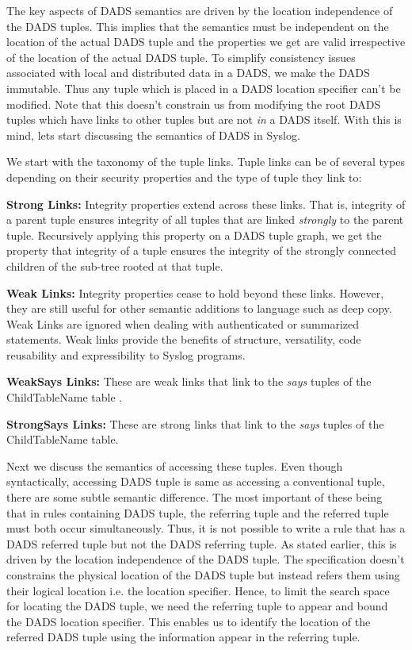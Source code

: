 The key aspects of DADS semantics are driven by the location independence of the DADS tuples. This implies that the semantics must be independent on the location of the actual DADS tuple and the properties we get are valid irrespective of the location of the actual DADS tuple. To simplify consistency issues associated with local and distributed data in a DADS, we make the DADS immutable. Thus any tuple which is placed in a DADS location specifier can't be modified. Note that this doesn't constrain us from modifying the root DADS tuples which have links to other tuples but are not {\em in} a DADS itself. With this is mind, lets start discussing the semantics of DADS in Syslog.

We start with the taxonomy of the tuple links. Tuple links can be of several types depending on their security properties and the type of tuple they link to:
\be
\item {\bf Strong Links:} Integrity properties extend across these links. That is, integrity of a parent tuple ensures integrity of all tuples that are linked {\em strongly} to the parent tuple. Recursively applying this property on a DADS tuple graph, we get the property that integrity of a tuple ensures the integrity of the strongly connected children of the sub-tree rooted at that tuple.
\item {\bf Weak Links:} Integrity properties cease to hold beyond these links. However, they are still useful for other semantic additions to language such as deep copy. Weak Links are ignored when dealing with authenticated or summarized statements. Weak links provide the benefits of structure, versatility, code reusability and expressibility to Syslog programs.
\item {\bf WeakSays Links:} These are weak links that link to the {\em says} tuples of the ChildTableName table . 
\item {\bf StrongSays Links:} These are strong links that link to the {\em says} tuples of the ChildTableName table.
\ee

Next we discuss the semantics of accessing these tuples. Even though syntactically, accessing DADS tuple is same as accessing a conventional tuple, there are some subtle semantic difference. The most important of these being that in rules containing DADS tuple, the referring tuple and the referred tuple must both occur simultaneously. Thus, it is not possible to write a rule that has a DADS referred tuple but not the DADS referring tuple. As stated earlier, this is driven by the location independence of the DADS tuple. The specification doesn't constrains the physical location of the DADS tuple but instead refers them using their logical location i.e. the location specifier. Hence, to limit the search space for locating the DADS tuple, we need the referring tuple to appear and bound the DADS location specifier. This enables us to identify the location of the referred DADS tuple using the information appear in the referring tuple. 

